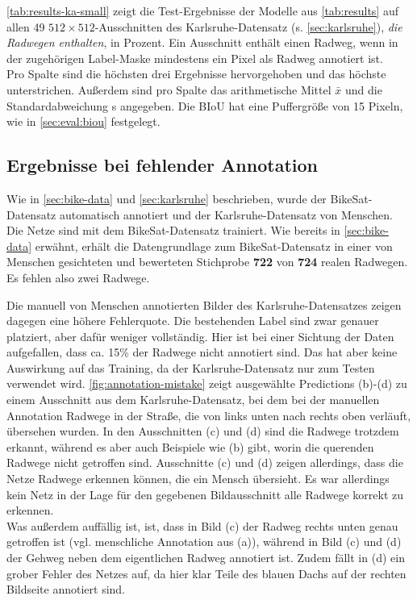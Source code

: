 \autoref{tab:results-ka-small} zeigt die Test-Ergebnisse der Modelle aus \autoref{tab:results} 
auf allen 49 $512{\times}512$-Ausschnitten des Karlsruhe-Datensatz (s. \autoref{sec:karlsruhe}), 
\textit{die Radwegen enthalten}, in Prozent. 
Ein Ausschnitt enthält einen Radweg, wenn in der zugehörigen Label-Maske mindestens ein Pixel als Radweg annotiert ist. \\
Pro Spalte sind die höchsten drei Ergebnisse hervorgehoben und das höchste unterstrichen.
Außerdem sind pro Spalte das arithmetische Mittel $\bar{x}$ und die Standardabweichung s angegeben. 
Die \ac{BIoU} hat eine Puffergröße von 15 Pixeln, wie in \autoref{sec:eval:biou} festgelegt.

\subsection{Ergebnisse bei fehlender Annotation}

Wie in \autoref{sec:bike-data} und \ref{sec:karlsruhe} beschrieben, wurde der BikeSat-Datensatz automatisch 
annotiert und der Karlsruhe-Datensatz von Menschen. Die Netze sind mit dem BikeSat-Datensatz trainiert. 
Wie bereits in \autoref{sec:bike-data} erwähnt, erhält die Datengrundlage zum BikeSat-Datensatz 
in einer von Menschen gesichteten und bewerteten Stichprobe \textbf{722} von \textbf{724} realen Radwegen.
Es fehlen also zwei Radwege. 

Die manuell von Menschen annotierten Bilder des Karlsruhe-Datensatzes zeigen dagegen eine höhere 
Fehlerquote. Die bestehenden Label sind zwar genauer platziert, aber dafür weniger vollständig. 
Hier ist bei einer Sichtung der Daten aufgefallen, dass ca. 15\% der Radwege nicht annotiert sind. 
Das hat aber keine Auswirkung auf das Training, da der Karlsruhe-Datensatz nur zum Testen verwendet wird.
\autoref{fig:annotation-mistake} zeigt ausgewählte Predictions (b)-(d) 
zu einem Ausschnitt aus dem Karlsruhe-Datensatz, bei dem bei der manuellen Annotation 
Radwege in der Straße, die von links unten nach rechts oben verläuft, übersehen wurden. 
In den Ausschnitten (c) und (d) sind die Radwege trotzdem erkannt, während es aber auch 
Beispiele wie (b) gibt, worin die querenden Radwege nicht getroffen sind. Ausschnitte (c) 
und (d) zeigen allerdings, dass die Netze Radwege erkennen können, die ein Mensch übersieht.
Es war allerdings kein Netz in der Lage für den gegebenen Bildausschnitt alle Radwege korrekt 
zu erkennen. \\
Was außerdem auffällig ist, ist, dass in Bild (c) der Radweg rechts unten genau getroffen ist 
(vgl. menschliche Annotation aus (a)), während in Bild (c) und (d) der Gehweg neben dem eigentlichen 
Radweg annotiert ist. Zudem fällt in (d) ein grober Fehler des Netzes auf, da hier klar Teile des 
blauen Dachs auf der rechten Bildseite annotiert sind.

